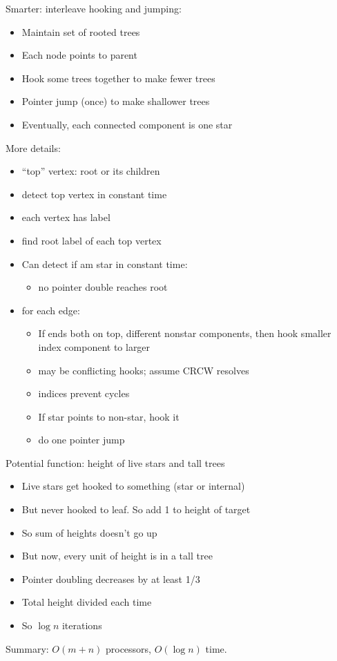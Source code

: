 \documentclass[12pt]{article}
\begin{document}
Smarter: interleave hooking and jumping:
\begin{itemize}
\item Maintain set of rooted trees
\item Each node points to parent
\item Hook some trees together to make fewer trees
\item Pointer jump (once) to make shallower trees
\item Eventually, each connected component is one star
\end{itemize}

More details:
\begin{itemize}
\item ``top'' vertex: root or its children
\item detect top vertex in constant time
\item each vertex has label
\item find root label of each top vertex
\item Can detect if am star in constant time:
\begin{itemize}
\item no pointer double reaches root
\end{itemize}
\item for each edge:
\begin{itemize}
\item If ends both on top, different nonstar components, then hook smaller
  index component to larger
\item may be conflicting hooks; assume CRCW resolves
\item indices prevent cycles
\item If star points to non-star, hook it
\item do one pointer jump
\end{itemize}
\end{itemize}

Potential function: height of live stars and tall trees
\begin{itemize}
\item Live stars get hooked to something (star or internal)
\item But never hooked to leaf.  So add 1 to height of target
\item So sum of heights doesn't go up
\item But now, every unit of height is in a tall tree
\item Pointer doubling decreases by at least 1/3
\item Total height divided each time
\item So $\log n$ iterations
\end{itemize}
Summary: $O(m+n)$ processors, $O(\log n)$ time.
\end{document}
